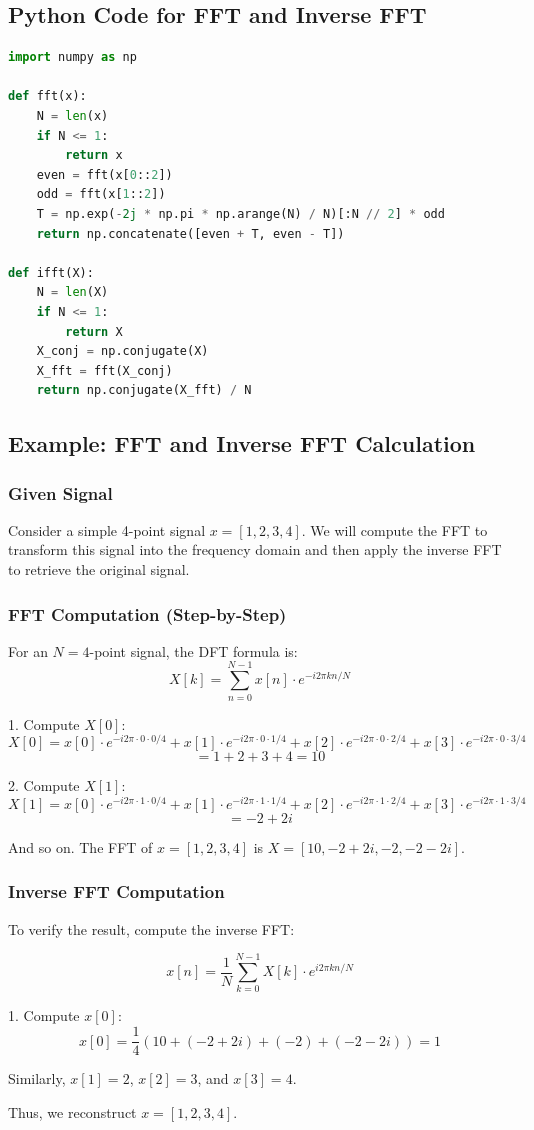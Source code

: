 \documentclass{article}
\begin{document}
\subsection{Python Code for FFT and Inverse FFT}

\begin{lstlisting}[language=Python]
import numpy as np

def fft(x):
    N = len(x)
    if N <= 1:
        return x
    even = fft(x[0::2])
    odd = fft(x[1::2])
    T = np.exp(-2j * np.pi * np.arange(N) / N)[:N // 2] * odd
    return np.concatenate([even + T, even - T])

def ifft(X):
    N = len(X)
    if N <= 1:
        return X
    X_conj = np.conjugate(X)
    X_fft = fft(X_conj)
    return np.conjugate(X_fft) / N
\end{lstlisting}


\subsection{Example: FFT and Inverse FFT Calculation}

\subsubsection{Given Signal}
Consider a simple 4-point signal \( x = [1, 2, 3, 4] \). We will compute the FFT to transform this signal into the frequency domain and then apply the inverse FFT to retrieve the original signal.

\subsubsection{FFT Computation (Step-by-Step)}

For an \( N = 4 \)-point signal, the DFT formula is:
\[
X[k] = \sum_{n=0}^{N-1} x[n] \cdot e^{-i 2 \pi k n / N}
\]

1. Compute \( X[0] \):
\[
X[0] = x[0] \cdot e^{-i 2 \pi \cdot 0 \cdot 0 / 4} + x[1] \cdot e^{-i 2 \pi \cdot 0 \cdot 1 / 4} + x[2] \cdot e^{-i 2 \pi \cdot 0 \cdot 2 / 4} + x[3] \cdot e^{-i 2 \pi \cdot 0 \cdot 3 / 4}
\]
\[
= 1 + 2 + 3 + 4 = 10
\]

2. Compute \( X[1] \):
\[
X[1] = x[0] \cdot e^{-i 2 \pi \cdot 1 \cdot 0 / 4} + x[1] \cdot e^{-i 2 \pi \cdot 1 \cdot 1 / 4} + x[2] \cdot e^{-i 2 \pi \cdot 1 \cdot 2 / 4} + x[3] \cdot e^{-i 2 \pi \cdot 1 \cdot 3 / 4}
\]
\[
= -2 + 2i
\]

And so on. The FFT of \( x = [1, 2, 3, 4] \) is \( X = [10, -2 + 2i, -2, -2 - 2i] \).

\subsubsection{Inverse FFT Computation}
To verify the result, compute the inverse FFT:

\[
x[n] = \frac{1}{N} \sum_{k=0}^{N-1} X[k] \cdot e^{i 2 \pi k n / N}
\]

1. Compute \( x[0] \):
\[
x[0] = \frac{1}{4} (10 + (-2 + 2i) + (-2) + (-2 - 2i)) = 1
\]

Similarly, \( x[1] = 2 \), \( x[2] = 3 \), and \( x[3] = 4 \).

Thus, we reconstruct \( x = [1, 2, 3, 4] \).
\end{document}
